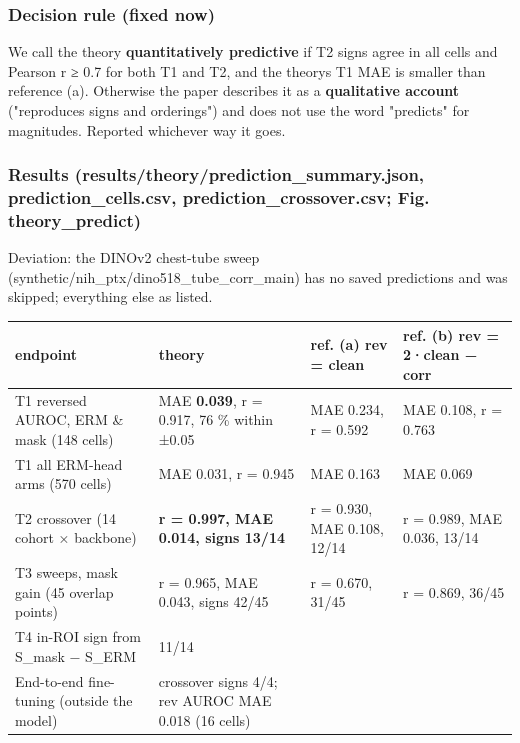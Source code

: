 {\subsubsection{Decision rule (fixed now)}\label{decision-rule-fixed-now}

We call the theory \textbf{quantitatively predictive} if T2 signs agree in all cells and Pearson r ≥ 0.7 for both T1
and T2, and the theory\textquotesingle s T1 MAE is smaller than reference (a). Otherwise the paper describes it as a \textbf{qualitative
account} ("reproduces signs and orderings") and does not use the word "predicts" for magnitudes. Reported whichever
way it goes.

\subsubsection{Results (results/theory/prediction\_summary.json, prediction\_cells.csv, prediction\_crossover.csv; Fig. theory\_predict)}\label{results-resultstheoryprediction_summaryjson-prediction_cellscsv-prediction_crossovercsv-fig-theory_predict}

Deviation: the DINOv2 chest-tube sweep (synthetic/nih\_ptx/dino518\_tube\_corr\_main) has no saved predictions and was
skipped; everything else as listed.

{ %
\begin{longtable}[]{@{}llll@{}}
\toprule\noalign{}
endpoint & theory & ref. (a) rev = clean & ref. (b) rev = 2·clean − corr \\
\midrule\noalign{}
\endhead
\bottomrule\noalign{}
\endlastfoot
T1 reversed AUROC, ERM \& mask (148 cells) & MAE \textbf{0.039}, r = 0.917, 76 \% within ±0.05 & MAE 0.234, r = 0.592 & MAE 0.108, r = 0.763 \\
T1 all ERM-head arms (570 cells) & MAE 0.031, r = 0.945 & MAE 0.163 & MAE 0.069 \\
T2 crossover (14 cohort × backbone) & \textbf{r = 0.997, MAE 0.014, signs 13/14} & r = 0.930, MAE 0.108, 12/14 & r = 0.989, MAE 0.036, 13/14 \\
T3 sweeps, mask gain (45 overlap points) & r = 0.965, MAE 0.043, signs 42/45 & r = 0.670, 31/45 & r = 0.869, 36/45 \\
T4 in-ROI sign from S\_mask − S\_ERM & 11/14 & & \\
End-to-end fine-tuning (outside the model) & crossover signs 4/4; rev AUROC MAE 0.018 (16 cells) & & \\
\end{longtable}
}

}

